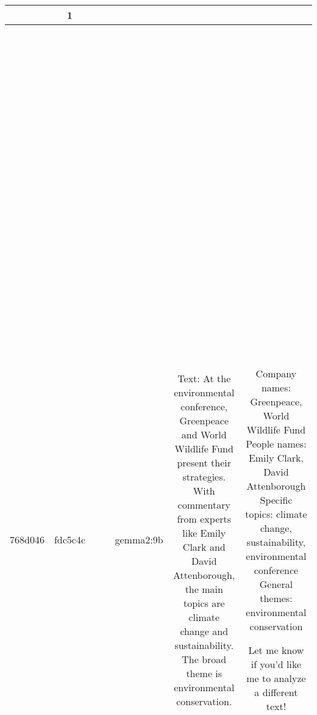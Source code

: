 \begin{table}[h!]
\begin{tabular}{|c|c|c|c|c|c|c|c|c|c|}
{OK & 1\\
\hline
768d046 & fdc5c4c &  &  & gemma2:9b & Text: At the environmental conference, Greenpeace and World Wildlife Fund present their strategies. With commentary from experts like Emily Clark and David Attenborough, the main topics are climate change and sustainability. The broad theme is environmental conservation. & Company names: Greenpeace, World Wildlife Fund 
People names: Emily Clark, David Attenborough
Specific topics: climate change, sustainability, environmental conference
General themes: environmental conservation  


Let me know if you'd like me to analyze a different text! 
 & err & The chatbot's output provides information extracted in the desired format specified in the description. It breaks down the entities into sections: Company names, People names, Specific topics, and General themes, using comma-separated lists where appropriate. Each section title is followed by a colon and the extracted information. However, the description requires that the output follows the format with only extractions and not include any additional commentary or invitations for further interaction. The additional line, "Let me know if you'd like me to analyze a different text!" does not comply with the described format of output, which makes it a violation.

ERR & 1\\
\hline
768d046 & fdc5c4c &  &  & qwen2.5:3b & Text: At the environmental conference, Greenpeace and World Wildlife Fund present their strategies. With commentary from experts like Emily Clark and David Attenborough, the main topics are climate change and sustainability. The broad theme is environmental conservation. & Company names: World Wildlife Fund
People names: Emily Clark, David Attenborough 
Specific topics: Climate change, Sustainability  
General themes: Environmental Conservation & ok & The chatbot output follows the desired format provided in the description. The output is organized into four sections which match the required sections in the format: Company names, People names, Specific topics, and General themes. Each section contains a comma-separated list of the relevant elements, consistent with the structural guidelines specified. Assuming that the provided information aligns with the input, the output adheres to the format criteria laid out in the description.

OK & 1\\
\hline
768d046 & fdc5c4c &  &  & llama3.2:1b & Text: At the environmental conference, Greenpeace and World Wildlife Fund present their strategies. With commentary from experts like Emily Clark and David Attenborough, the main topics are climate change and sustainability. The broad theme is environmental conservation. & Here's an extraction of the important elements of text:

}
\end{tabular}
\end{table}
